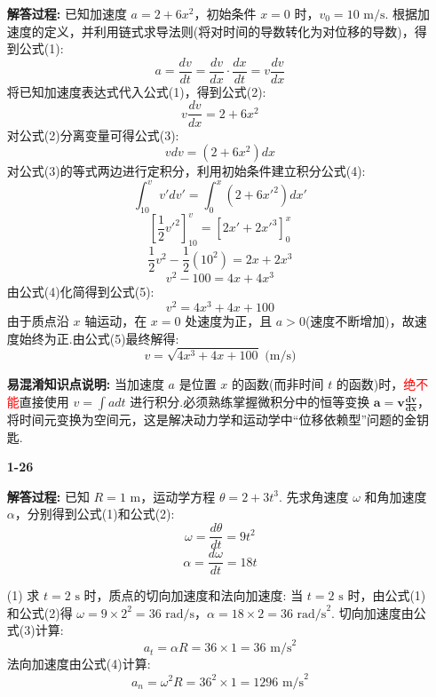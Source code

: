 \begin{enumerate}
\textbf{解答过程:}
已知加速度 $a = 2 + 6x^2$，初始条件 $x=0$ 时，$v_0 = 10 \text{ m/s}$.
根据加速度的定义，并利用链式求导法则(将对时间的导数转化为对位移的导数)，得到公式(1):
\begin{equation}
	a = \frac{dv}{dt} = \frac{dv}{dx} \cdot \frac{dx}{dt} = v \frac{dv}{dx}
\end{equation}
将已知加速度表达式代入公式(1)，得到公式(2):
\begin{equation}
	v \frac{dv}{dx} = 2 + 6x^2
\end{equation}
对公式(2)分离变量可得公式(3):
\begin{equation}
	v dv = (2 + 6x^2) dx
\end{equation}
对公式(3)的等式两边进行定积分，利用初始条件建立积分公式(4):
\begin{equation}
	\int_{10}^{v} v' dv' = \int_{0}^{x} (2 + 6x'^2) dx'
\end{equation}
$$ \left[ \frac{1}{2}v'^2 \right]_{10}^{v} = \left[ 2x' + 2x'^3 \right]_{0}^{x} $$
$$ \frac{1}{2}v^2 - \frac{1}{2}(10^2) = 2x + 2x^3 $$
$$ v^2 - 100 = 4x + 4x^3 $$
由公式(4)化简得到公式(5):
\begin{equation}
	v^2 = 4x^3 + 4x + 100
\end{equation}
由于质点沿 $x$ 轴运动，在 $x=0$ 处速度为正，且 $a > 0$(速度不断增加)，故速度始终为正.由公式(5)最终解得:
$$ v = \sqrt{4x^3 + 4x + 100} \text{ (m/s)} $$

\textbf{易混淆知识点说明:}
当加速度 $a$ 是位置 $x$ 的函数(而非时间 $t$ 的函数)时，\textcolor{red}{绝不能}直接使用 $v = \int a dt$ 进行积分.必须熟练掌握微积分中的恒等变换 $\mathbf{a = v \frac{dv}{dx}}$，将时间元变换为空间元，这是解决动力学和运动学中“位移依赖型”问题的金钥匙.

\vspace{2em}

\item[\textbf{1-26}]


\textbf{解答过程:}
已知 $R = 1\text{ m}$，运动学方程 $\theta = 2 + 3t^3$.
先求角速度 $\omega$ 和角加速度 $\alpha$，分别得到公式(1)和公式(2):
\begin{equation}
	\omega = \frac{d\theta}{dt} = 9t^2
\end{equation}
\begin{equation}
	\alpha = \frac{d\omega}{dt} = 18t
\end{equation}

(1) 求 $t = 2\text{ s}$ 时，质点的切向加速度和法向加速度:
当 $t = 2\text{ s}$ 时，由公式(1)和公式(2)得 $\omega = 9 \times 2^2 = 36 \text{ rad/s}$，$\alpha = 18 \times 2 = 36 \text{ rad/s}^2$.
切向加速度由公式(3)计算:
\begin{equation}
	a_t = \alpha R = 36 \times 1 = 36 \text{ m/s}^2
\end{equation}
法向加速度由公式(4)计算:
\begin{equation}
	a_n = \omega^2 R = 36^2 \times 1 = 1296 \text{ m/s}^2
\end{equation}


\end{enumerate}
